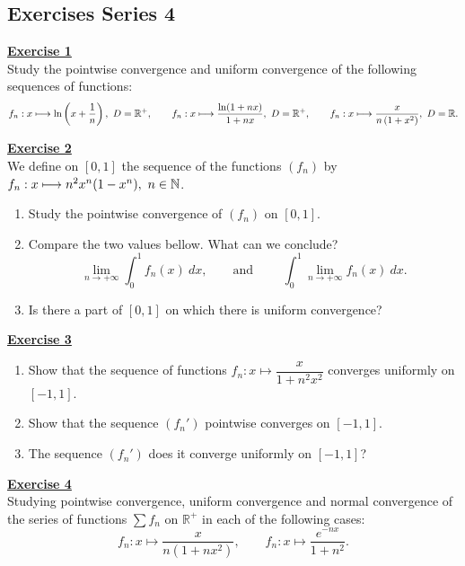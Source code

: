 \subsection{Exercises Series 4}
\vspace*{0.2cm}
\Large{\underline{\textbf{Exercise 1}}}
\normalsize{}\\
\noindent Study the pointwise convergence and uniform convergence of the following sequences of functions:
$$ f_n : x \longmapsto \ln\left(x + \dfrac{1}{n}\right),\ D = \mathbb{R}^+, \qquad
   f_n : x \longmapsto \dfrac{\ln(1 + nx)}{1 + nx},\ D = \mathbb{R}^+, \qquad
   f_n : x \longmapsto \dfrac{x}{n\left(1 + x^2\right)},\ D = \mathbb{R}. $$

\noindent\Large{\underline{\textbf{Exercise 2}}}
\normalsize{}\\
\noindent We define on $[0,1]$ the sequence of the functions $(f_n)$ by $f_n : x \longmapsto n^2x^n(1 - x^n),\ n\in\N$.
\begin{enumerate}
    \item Study the pointwise convergence of $(f_n)$ on $[0,1]$.
    \item Compare the two values bellow. What can we conclude?
        $$ \lim_{n \longrightarrow +\infty}\int_0^1 f_n(x)\ dx,\qquad \text{and } \qquad 
           \int_0^1\lim_{n \longrightarrow +\infty} f_n(x)\ dx.$$
    \item Is there a part of $[0,1]$ on which there is uniform convergence?\\
\end{enumerate}

\noindent\Large{\underline{\textbf{Exercise 3}}}
\normalsize{}\\
\begin{enumerate}
    \item Show that the sequence of functions $f_n : x \longmapsto \dfrac{x}{1 + n^2x^2}$ converges uniformly on $[-1, 1]$.
    \item Show that the sequence $(f_n')$ pointwise converges on $[-1,1]$.
    \item The sequence $(f_n')$ does it converge uniformly on $[-1,1]$?\\
\end{enumerate}

\noindent\Large{\underline{\textbf{Exercise 4}}}
\normalsize{}\\
\noindent Studying pointwise convergence, uniform convergence and normal convergence of the series of functions 
$\displaystyle\sum f_n$ on $\mathbb{R}^+$ in each of the following cases:
$$ f_n : x \longmapsto \dfrac{x}{n\left(1 + nx^2\right)}, \qquad f_n : x \longmapsto \dfrac{e^{-nx}}{1 + n^2}. $$

